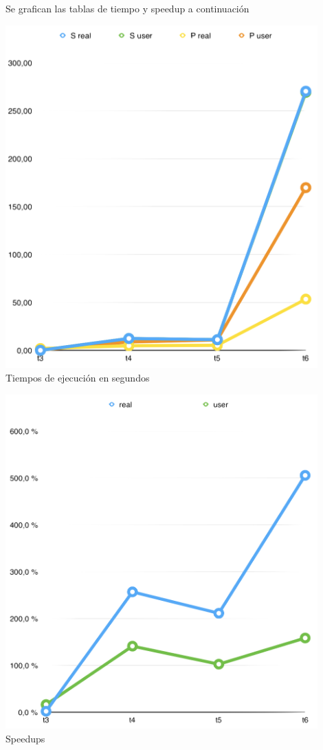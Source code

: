 \documentclass[10pt]{extarticle}
\begin{document}
Se grafican las tablas de tiempo y speedup a continuación

\begin{center}
 \includegraphics[width=12cm]{imgs/graph_seconds.png}\\
 \footnotesize{Tiempos de ejecución en segundos}\\
\end{center}

\begin{center}
 \includegraphics[width=12cm]{imgs/graph_speedup.png}\\
 \footnotesize{Speedups}\\
\end{center}
\end{document}
